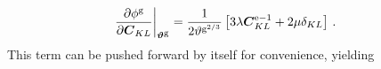 \documentclass[10pt,letterpaper,oneside]{report}
\newcommand{\ten}[1]{\mbox{\boldmath $#1$}{}}
\newcommand{\tenf}[1]{\mbox{{\sffamily{\bfseries {#1}}}}}
\newcommand{\scas}[1]{\mbox{{\scriptsize{${\rm{#1}}$}}}{}}
\newcommand{\tens}[1]{\mbox{\boldmath{\scriptsize{$#1$}}}{}}
\begin{document}
\begin{itemize}
\begin{align}
\left. \frac{ \partial \phi^{\scas{g}} }{ \partial \ten{C}_{KL} } \right|_{\tens{\vartheta}^{\scas{g}}}  ={}& \frac{1}{2 \vartheta^{\scas{g}^{2/3}}} \left[ 3 \lambda \ten{C}^{\scas{e}-1}_{KL} + 2 \mu \delta_{KL} \right] \, . 
\end{align}
This term can be pushed forward by itself for convenience, yielding 
\begin{align}

\end{align}
\end{itemize}
\end{document}
